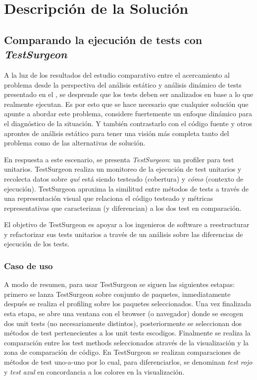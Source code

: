 \chapter{Descripción de la Solución}


\section{Comparando la ejecución de tests con \emph{TestSurgeon}}

\par A la luz de los resultados del estudio comparativo entre el acercamiento al problema desde la perspectiva del análisis estático y análisis dinámico de  tests presentado en el , se desprende que los tests deben ser analizados en base a lo que realmente ejecutan. Es por esto que se hace necesario que cualquier solución que apunte a abordar este problema, considere fuertemente un enfoque dinámico para el diagnóstico de la situación. Y también contrastarlo con el código fuente y otros aprontes de análisis estático para tener una visión más completa tanto del problema como de las alternativas de solución. 

\par En respuesta a este escenario, se presenta \emph{TestSurgeon}: un profiler para test unitarios. TestSurgeon realiza un monitoreo de la ejecución de test unitarios y recolecta datos sobre \emph{qué} está siendo testeado (cobertura) y \emph{cómo} (contexto de ejecución). TestSurgeon aproxima la similitud entre métodos de tests a través de una representación visual que relaciona el código testeado y métricas representativas que caracterizan (y diferencian) a los dos test en comparación. 

\par El objetivo de TestSurgeon es apoyar a los ingenieros de software a reestructurar y refactorizar sus tests unitarios a través de un análisis sobre las diferencias de ejecución de los tests.

\subsection{Caso de uso}
\par A modo de resumen, para usar TestSurgeon se siguen las siguientes estapas: primero se lanza TestSurgeon sobre conjunto de paquetes, inmediatamente después se realiza el profiling sobre los paquetes seleccionados. Una vez finalizada esta etapa, se abre una ventana con el browser (o navegador) donde se escogen dos unit tests (no necesariamente distintos), posteriormente se seleccionan dos métodos de test pertenecientes a los unit tests escodigos. Finalmente se realiza la comparación entre los test methods seleccionados através de la visualización y la zona de comparación de código. En TestSurgeon se realizan comparaciones de métodos de test uno-a-uno por lo cual, para diferenciarlos, se denominan \emph{test rojo} y \emph{test azul} en concordancia a los colores en la visualización.

